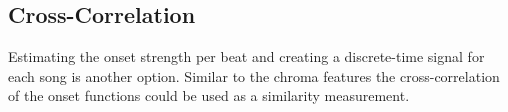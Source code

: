\subsection{Cross-Correlation}

Estimating the onset strength per beat and creating a discrete-time signal for each song is another option. Similar to the chroma features the cross-correlation of the onset functions could be used as a similarity measurement. 

\begin{figure}[htbp]
	\centering
\end{figure}
